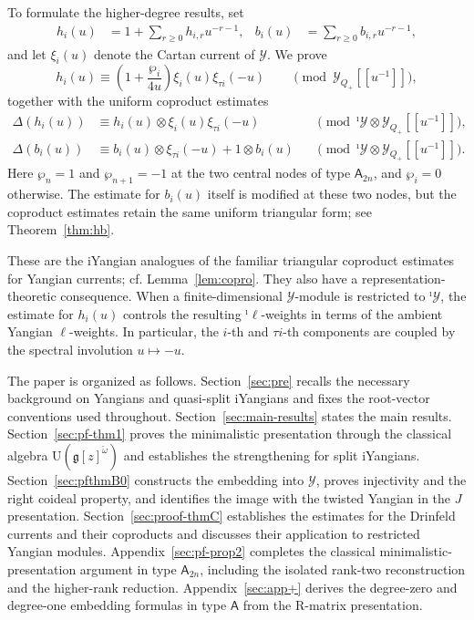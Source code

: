\documentclass[11pt,reqno]{amsart}
\numberwithin{equation}{section}
\theoremstyle{definition}
\theoremstyle{remark}
\newcommand{\g}{\mathfrak{g}}
\newcommand{\gge}{\geqslant}
\newcommand{\Y}{{\mathscr{Y}}}
\newcommand{\Yi}{{^\imath\mathscr{Y}}}
\begin{document}
To formulate the higher-degree results, set
\begin{align*}
h_i(u)&=1+\sum_{r\gge0}h_{i,r}u^{-r-1},
&
b_i(u)&=\sum_{r\gge0}b_{i,r}u^{-r-1},
\end{align*}
and let $\xi_i(u)$ denote the Cartan current of $\Y$. We prove
\begin{equation*}
h_i(u)\equiv
\left(1+\frac{\wp_i}{4u}\right)
\xi_i(u)\xi_{\tau i}(-u)
\qquad
\pmod{\Y_{Q_+}[\![u^{-1}]\!]},
\end{equation*}
together with the uniform coproduct estimates
\begin{align*}
\Delta(h_i(u))
&\equiv
h_i(u)\otimes\xi_i(u)\xi_{\tau i}(-u)
&&\pmod{\Yi\otimes\Y_{Q_+}[\![u^{-1}]\!]},
\\
\Delta(b_i(u))
&\equiv
b_i(u)\otimes\xi_{\tau i}(-u)+1\otimes b_i(u)
&&\pmod{\Yi\otimes\Y_{Q_+}[\![u^{-1}]\!]}.
\end{align*}
Here $\wp_n=1$ and $\wp_{n+1}=-1$ at the two central nodes of type $\mathsf A_{2n}$, and $\wp_i=0$ otherwise. The estimate for $b_i(u)$ itself is modified at these two nodes, but the coproduct estimates retain the same uniform triangular form; see Theorem~\ref{thm:hb}.

These are the iYangian analogues of the familiar triangular coproduct estimates for Yangian currents; cf. Lemma~\ref{lem:copro}. They also have a representation-theoretic consequence. When a finite-dimensional $\Y$-module is restricted to $\Yi$, the estimate for $h_i(u)$ controls the resulting $^\imath\bm\ell$-weights in terms of the ambient Yangian $\bm\ell$-weights. In particular, the $i$-th and $\tau i$-th components are coupled by the spectral involution $u\mapsto-u$.

The paper is organized as follows. Section~\ref{sec:pre} recalls the necessary background on Yangians and quasi-split iYangians and fixes the root-vector conventions used throughout. Section~\ref{sec:main-results} states the main results. Section~\ref{sec:pf-thm1} proves the minimalistic presentation through the classical algebra $\mathrm U(\g[z]^{\check\omega})$ and establishes the strengthening for split iYangians. Section~\ref{sec:pfthmB0} constructs the embedding into $\Y$, proves injectivity and the right coideal property, and identifies the image with the twisted Yangian in the $J$ presentation. Section~\ref{sec:proof-thmC} establishes the estimates for the Drinfeld currents and their coproducts and discusses their application to restricted Yangian modules. Appendix~\ref{sec:pf-prop2} completes the classical minimalistic-presentation argument in type $\mathsf A_{2n}$, including the isolated rank-two reconstruction and the higher-rank reduction. Appendix~\ref{sec:app+} derives the degree-zero and degree-one embedding formulas in type $\mathsf A$ from the R-matrix presentation. 
\end{document}
